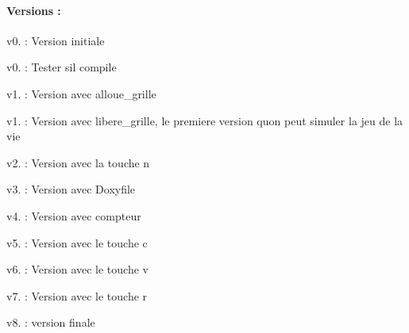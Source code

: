 \paragraph*{Versions \+:}


\begin{DoxyItemize}
\item v0. \+: Version initiale
\item v0. \+: Tester s\textquotesingle{}il compile
\item v1. \+: Version avec alloue\+\_\+grille
\item v1. \+: Version avec libere\+\_\+grille, le premiere version qu\textquotesingle{}on peut simuler la jeu de la vie
\item v2. \+: Version avec la touche \textquotesingle{}n\textquotesingle{}
\item v3. \+: Version avec Doxyfile
\item v4. \+: Version avec compteur
\item v5. \+: Version avec le touche \textquotesingle{}c\textquotesingle{}
\item v6. \+: Version avec le touche \textquotesingle{}v\textquotesingle{}
\item v7. \+: Version avec le touche \textquotesingle{}r\textquotesingle{}
\item v8. \+: version finale 
\end{DoxyItemize}